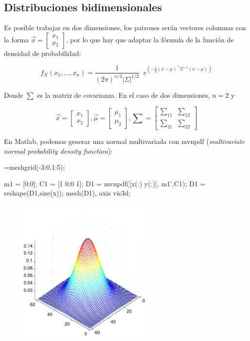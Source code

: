 \documentclass[11pt]{scrartcl}
\begin{document}
\subsection{Distribuciones bidimensionales}

Es posible trabajar en dos dimensiones, los patrones serán vectores columnas con
la forma $\vec{x} = \begin{bmatrix} x_1 \\ x_2 \end{bmatrix}$, por lo que hay
que adaptar la fórmula de la función de densidad de probabilidad:

\[
f_X(x_1, \dots, x_n)=\frac {1} {(2\pi)^{n/2} \left|\Sigma\right|^{1/2}}
\;\; e ^{\left( -\frac{1}{2}( x - \mu)^\top \Sigma^{-1} (x - \mu)\right)}
\]

Donde $\sum$ es la matriz de covarianza. En el caso de dos dimensiones, $n=2$ y 

\[
\vec{x} =
\begin{bmatrix}
  x_1 \\ x_2
\end{bmatrix}
, \vec{\mu} = 
\begin{bmatrix}
  \mu_1 \\ \mu_2
\end{bmatrix}
, \sum =
\begin{bmatrix}
  \sum_{11} & \sum_{12} \\
  \sum_{21} & \sum_{22}
\end{bmatrix}
\]

En Matlab, podemos generar una normal multivariada con mvnpdf
(\textit{multivariate normal probability density function}):

\begin{matlabcode}
[x,y]=meshgrid(-3:0.1:5);

m1 = [0;0];	
C1 = [1 0;0 1];
D1 = mvnpdf([x(:) y(:)], m1',C1);
D1 = reshape(D1,size(x));
mesh(D1), axis vis3d;  
\end{matlabcode}

\begin{figure}[h!]
  \centering
  \includegraphics[width=0.6\textwidth]{img/bayes_2d_1}
\end{figure}
\end{document}
